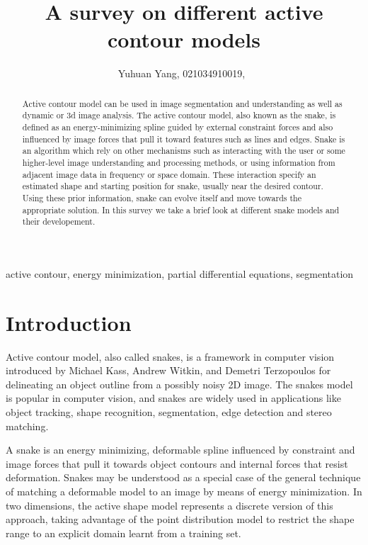 \documentclass[journal]{IEEEtran}
\begin{document}
\title{A survey on different active contour models}

\author{Yuhuan Yang, 021034910019,~
}

\maketitle

\begin{abstract}
Active contour model can be used in image segmentation and understanding as well as dynamic or 3d image analysis. The active contour model, also known as the snake, is defined as an energy-minimizing spline guided by external constraint forces and also influenced by image forces that pull it toward features such as lines and edges. Snake is an algorithm which rely on other mechanisms such as interacting with the user or some higher-level image understanding and processing methods, or using information from adjacent image data in frequency or space domain. These interaction specify an estimated shape and starting position for snake, usually near the desired contour. Using these prior information, snake can evolve itself and move towards the appropriate solution. In this survey we take a brief look at different snake models and their developement.
\end{abstract}

\begin{IEEEkeywords}
active contour, energy minimization,  partial differential equations, segmentation
\end{IEEEkeywords}


\IEEEpeerreviewmaketitle

\section{Introduction\cite{w}}
Active contour model, also called snakes, is a framework in computer vision introduced by Michael Kass, Andrew Witkin, and Demetri Terzopoulos\cite{snake} for delineating an object outline from a possibly noisy 2D image. The snakes model is popular in computer vision, and snakes are widely used in applications like object tracking, shape recognition, segmentation, edge detection and stereo matching.

A snake is an energy minimizing, deformable spline influenced by constraint and image forces that pull it towards object contours and internal forces that resist deformation. Snakes may be understood as a special case of the general technique of matching a deformable model to an image by means of energy minimization.\cite{snake} In two dimensions, the active shape model represents a discrete version of this approach, taking advantage of the point distribution model to restrict the shape range to an explicit domain learnt from a training set.
\end{document}
